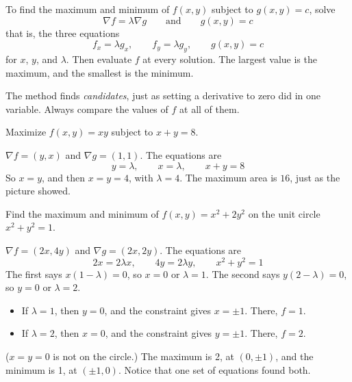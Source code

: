 \begin{mdframed}[style = important, frametitle = {Lagrange Multipliers}]
To find the maximum and minimum of $f(x, y)$ subject to $g(x, y) = c$, solve
$$\nabla f = \lambda\nabla g \qquad \text{and} \qquad g(x, y) = c$$
that is, the three equations
$$f_x = \lambda g_x, \qquad f_y = \lambda g_y, \qquad g(x, y) = c$$
for $x$, $y$, and $\lambda$. Then evaluate $f$ at every solution. The largest value is
the maximum, and the smallest is the minimum.
\end{mdframed}

The method finds \emph{candidates}, just as setting a derivative to zero did in one
variable. Always compare the values of $f$ at all of them.

\begin{Worked}
\begin{Problem}
Maximize $f(x, y) = xy$ subject to $x + y = 8$.
\end{Problem}
\begin{Solution}
$\nabla f = (y, x)$ and $\nabla g = (1, 1)$. The equations are
$$y = \lambda, \qquad x = \lambda, \qquad x + y = 8$$
So $x = y$, and then $x = y = 4$, with $\lambda = 4$. The maximum area is $16$, just as
the picture showed.
\end{Solution}
\end{Worked}

\begin{Worked}
\begin{Problem}
Find the maximum and minimum of $f(x, y) = x^2 + 2y^2$ on the unit
circle $x^2 + y^2 = 1$.
\end{Problem}
\begin{Solution}
$\nabla f = (2x, 4y)$ and $\nabla g = (2x, 2y)$. The equations are
$$2x = 2\lambda x, \qquad 4y = 2\lambda y, \qquad x^2 + y^2 = 1$$
The first says $x(1 - \lambda) = 0$, so $x = 0$ or $\lambda = 1$. The second says
$y(2 - \lambda) = 0$, so $y = 0$ or $\lambda = 2$.
\begin{itemize}
\item If $\lambda = 1$, then $y = 0$, and the constraint gives $x = \pm 1$. There, $f = 1$.
\item If $\lambda = 2$, then $x = 0$, and the constraint gives $y = \pm 1$. There, $f = 2$.
\end{itemize}
($x = y = 0$ is not on the circle.) The maximum is 2, at $(0, \pm 1)$, and the minimum
is 1, at $(\pm 1, 0)$. Notice that one set of equations found both.
\end{Solution}
\end{Worked}

